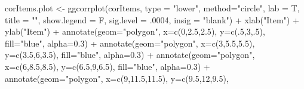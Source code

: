 \documentclass[
  letterpaper,
  DIV=11,
  numbers=noendperiod]{scrartcl}
\newenvironment{Shaded}{\begin{snugshade}}{\end{snugshade}}
\newcommand{\AttributeTok}[1]{\textcolor[rgb]{0.40,0.45,0.13}{#1}}
\newcommand{\DecValTok}[1]{\textcolor[rgb]{0.68,0.00,0.00}{#1}}
\newcommand{\FloatTok}[1]{\textcolor[rgb]{0.68,0.00,0.00}{#1}}
\newcommand{\FunctionTok}[1]{\textcolor[rgb]{0.28,0.35,0.67}{#1}}
\newcommand{\NormalTok}[1]{\textcolor[rgb]{0.00,0.23,0.31}{#1}}
\newcommand{\OtherTok}[1]{\textcolor[rgb]{0.00,0.23,0.31}{#1}}
\newcommand{\SpecialCharTok}[1]{\textcolor[rgb]{0.37,0.37,0.37}{#1}}
\newcommand{\StringTok}[1]{\textcolor[rgb]{0.13,0.47,0.30}{#1}}
\begin{document}
\begin{Shaded}
\begin{Highlighting}[]
\NormalTok{corItems.plot }\OtherTok{\textless{}{-}} \FunctionTok{ggcorrplot}\NormalTok{(corItems, }\AttributeTok{type =} \StringTok{"lower"}\NormalTok{, }
           \AttributeTok{method=}\StringTok{"circle"}\NormalTok{, }
           \AttributeTok{lab =}\NormalTok{ T, }
           \AttributeTok{title =} \StringTok{""}\NormalTok{,}
           \AttributeTok{show.legend =}\NormalTok{ F,}
           \AttributeTok{sig.level =}\NormalTok{ .}\DecValTok{0004}\NormalTok{,}
           \AttributeTok{insig =} \StringTok{"blank"}\NormalTok{) }\SpecialCharTok{+} 
  \FunctionTok{xlab}\NormalTok{(}\StringTok{"Item"}\NormalTok{) }\SpecialCharTok{+}
  \FunctionTok{ylab}\NormalTok{(}\StringTok{"Item"}\NormalTok{) }\SpecialCharTok{+}
  \FunctionTok{annotate}\NormalTok{(}\AttributeTok{geom=}\StringTok{"polygon"}\NormalTok{, }
           \AttributeTok{x=}\FunctionTok{c}\NormalTok{(}\DecValTok{0}\NormalTok{,}\FloatTok{2.5}\NormalTok{,}\FloatTok{2.5}\NormalTok{),}
           \AttributeTok{y=}\FunctionTok{c}\NormalTok{(.}\DecValTok{5}\NormalTok{,}\DecValTok{3}\NormalTok{,.}\DecValTok{5}\NormalTok{), }
           \AttributeTok{fill=}\StringTok{"blue"}\NormalTok{, }
           \AttributeTok{alpha=}\FloatTok{0.3}\NormalTok{) }\SpecialCharTok{+}
  \FunctionTok{annotate}\NormalTok{(}\AttributeTok{geom=}\StringTok{"polygon"}\NormalTok{, }
           \AttributeTok{x=}\FunctionTok{c}\NormalTok{(}\DecValTok{3}\NormalTok{,}\FloatTok{5.5}\NormalTok{,}\FloatTok{5.5}\NormalTok{),}
           \AttributeTok{y=}\FunctionTok{c}\NormalTok{(}\FloatTok{3.5}\NormalTok{,}\DecValTok{6}\NormalTok{,}\FloatTok{3.5}\NormalTok{), }
           \AttributeTok{fill=}\StringTok{"blue"}\NormalTok{, }
           \AttributeTok{alpha=}\FloatTok{0.3}\NormalTok{) }\SpecialCharTok{+}
  \FunctionTok{annotate}\NormalTok{(}\AttributeTok{geom=}\StringTok{"polygon"}\NormalTok{,}
           \AttributeTok{x=}\FunctionTok{c}\NormalTok{(}\DecValTok{6}\NormalTok{,}\FloatTok{8.5}\NormalTok{,}\FloatTok{8.5}\NormalTok{),}
           \AttributeTok{y=}\FunctionTok{c}\NormalTok{(}\FloatTok{6.5}\NormalTok{,}\DecValTok{9}\NormalTok{,}\FloatTok{6.5}\NormalTok{), }
           \AttributeTok{fill=}\StringTok{"blue"}\NormalTok{, }
           \AttributeTok{alpha=}\FloatTok{0.3}\NormalTok{) }\SpecialCharTok{+}
  \FunctionTok{annotate}\NormalTok{(}\AttributeTok{geom=}\StringTok{"polygon"}\NormalTok{,}
           \AttributeTok{x=}\FunctionTok{c}\NormalTok{(}\DecValTok{9}\NormalTok{,}\FloatTok{11.5}\NormalTok{,}\FloatTok{11.5}\NormalTok{),}
           \AttributeTok{y=}\FunctionTok{c}\NormalTok{(}\FloatTok{9.5}\NormalTok{,}\DecValTok{12}\NormalTok{,}\FloatTok{9.5}\NormalTok{), }

\end{Highlighting}
\end{Shaded}
\end{document}
